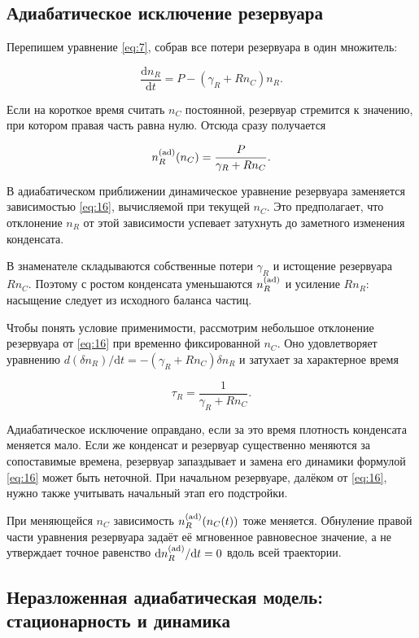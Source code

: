 \documentclass[12pt,a4paper]{article}
\begin{document}
\subsection{Адиабатическое исключение резервуара}\label{sec:4.1}

Перепишем уравнение \eqref{eq:7}, собрав все потери резервуара в один множитель:

\[
\frac{\mathrm dn_R}{\mathrm dt}=P-(\gamma_R+Rn_C)n_R.
\]

Если на короткое время считать $n_{C}$ постоянной, резервуар стремится к значению, при котором правая часть равна нулю. Отсюда сразу получается

\begin{equation}\label{eq:16}
n_R^{(\rm ad)}(n_C)=\frac{P}{\gamma_R+Rn_C}.\end{equation}

В адиабатическом приближении динамическое уравнение резервуара заменяется зависимостью \eqref{eq:16}, вычисляемой при текущей $n_{C}$. Это предполагает, что отклонение $n_{R}$ от этой зависимости успевает затухнуть до заметного изменения конденсата.

В знаменателе складываются собственные потери $\gamma_{R}$ и истощение резервуара $R n_{C}$. Поэтому с ростом конденсата уменьшаются $n_{R}^{(\rm ad)}$ и усиление $R n_{R}$: насыщение следует из исходного баланса частиц.

Чтобы понять условие применимости, рассмотрим небольшое отклонение резервуара от \eqref{eq:16} при временно фиксированной $n_{C}$. Оно удовлетворяет уравнению $d(\delta n_{R})/\mathrm dt=-(\gamma_{R}+R n_{C})\delta n_{R}$ и затухает за характерное время

\[
\tau_R=\frac{1}{\gamma_R+Rn_C}.
\]

Адиабатическое исключение оправдано, если за это время плотность конденсата меняется мало. Если же конденсат и резервуар существенно меняются за сопоставимые времена, резервуар запаздывает и замена его динамики формулой \eqref{eq:16} может быть неточной. При начальном резервуаре, далёком от \eqref{eq:16}, нужно также учитывать начальный этап его подстройки.

При меняющейся $n_{C}$ зависимость $n_{R}^{(\rm ad)}(n_{C}(t))$ тоже меняется. Обнуление правой части уравнения резервуара задаёт её мгновенное равновесное значение, а не утверждает точное равенство $\mathrm d n_{R}^{(\rm ad)}/\mathrm dt=0$ вдоль всей траектории.

\subsection{Неразложенная адиабатическая модель: стационарность и динамика}\label{sec:4.2}
\end{document}
